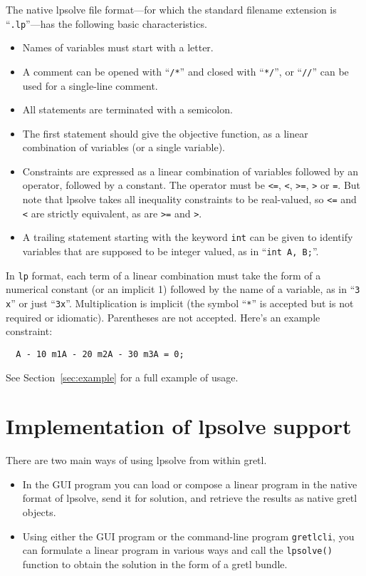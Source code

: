 \documentclass{article}
\begin{document}
The native \textsf{lpsolve} file format---for which the standard
filename extension is ``\texttt{.lp}''---has the following
basic characteristics.
\begin{itemize}
\item Names of variables must start with a letter.
\item A comment can be opened with ``\texttt{/*}'' and closed with
  ``\texttt{*/}'', or ``\texttt{//}'' can be used for a single-line
  comment.
\item All statements are terminated with a semicolon.
\item The first statement should give the objective function, as a
  linear combination of variables (or a single variable).
\item Constraints are expressed as a linear combination of variables
  followed by an operator, followed by a constant.  The operator must
  be \texttt{<=}, \texttt{<}, \texttt{>=}, \texttt{>} or \texttt{=}.
  But note that \textsf{lpsolve} takes all inequality constraints to
  be real-valued, so \texttt{<=} and \texttt{<} are strictly
  equivalent, as are \texttt{>=} and \texttt{>}.
\item A trailing statement starting with the keyword \texttt{int} can
  be given to identify variables that are supposed to be integer
  valued, as in ``\texttt{int A, B;}''.
\end{itemize}

In \texttt{lp} format, each term of a linear combination must take the
form of a numerical constant (or an implicit 1) followed by the name
of a variable, as in ``\texttt{3 x}'' or just
``\texttt{3x}''. Multiplication is implicit (the symbol ``\texttt{*}''
is accepted but is not required or idiomatic). Parentheses are not
accepted. Here's an example constraint:
\begin{verbatim}
  A - 10 m1A - 20 m2A - 30 m3A = 0;
\end{verbatim}
See Section~\ref{sec:example} for a full example of usage.

\section{Implementation of lpsolve support}
\label{sec:implement}

There are two main ways of using \textsf{lpsolve} from within gretl.
\begin{itemize}
\item In the GUI program you can load or compose a linear program in
  the native format of \textsf{lpsolve}, send it for solution, and
  retrieve the results as native gretl objects.
\item Using either the GUI program or the command-line program
  \texttt{gretlcli}, you can formulate a linear program in various
  ways and call the \texttt{lpsolve()} function to obtain the solution
  in the form of a gretl bundle.
\end{itemize}
\end{document}
